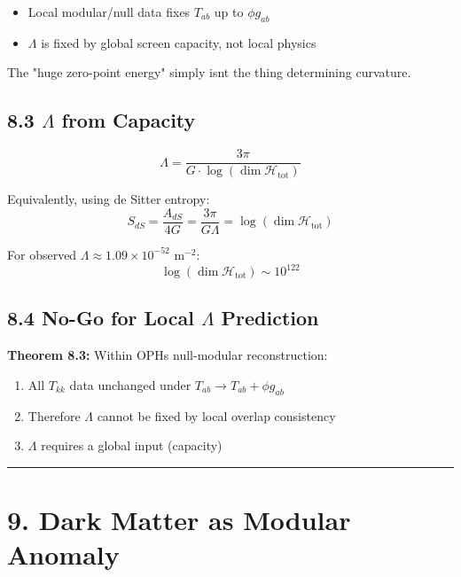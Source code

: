 \begin{itemize}
\tightlist
\item
  Local modular/null data fixes \(T_{ab}\) up to \(\phi g_{ab}\)
\item
  \(\Lambda\) is fixed by global screen capacity, not local physics
\end{itemize}

The "huge zero-point energy" simply isn\textquotesingle t the thing determining curvature.

\subsection{8.3 $\Lambda$ from Capacity}\label{83-ux3bb-from-capacity}

\[\Lambda = \frac{3\pi}{G \cdot \log(\dim \mathcal{H}_{\text{tot}})}\]

Equivalently, using de Sitter entropy: \[S_{dS} = \frac{A_{dS}}{4G} = \frac{3\pi}{G\Lambda} = \log(\dim \mathcal{H}_{\text{tot}})\]

For observed \(\Lambda \approx 1.09 \times 10^{-52}\) m\(^{-2}\): \[\log(\dim \mathcal{H}_{\text{tot}}) \sim 10^{122}\]

\subsection{8.4 No-Go for Local $\Lambda$ Prediction}\label{84-no-go-for-local-ux3bb-prediction}

\textbf{Theorem 8.3:} Within OPH\textquotesingle s null-modular reconstruction:

\begin{enumerate}
\def\labelenumi{\arabic{enumi}.}
\tightlist
\item
  All \(T_{kk}\) data unchanged under \(T_{ab} \to T_{ab} + \phi g_{ab}\)
\item
  Therefore \(\Lambda\) cannot be fixed by local overlap consistency
\item
  \(\Lambda\) requires a global input (capacity)
\end{enumerate}

\begin{center}\rule{0.5\linewidth}{0.5pt}\end{center}

\section{9. Dark Matter as Modular Anomaly}\label{9-dark-matter-as-modular-anomaly}

